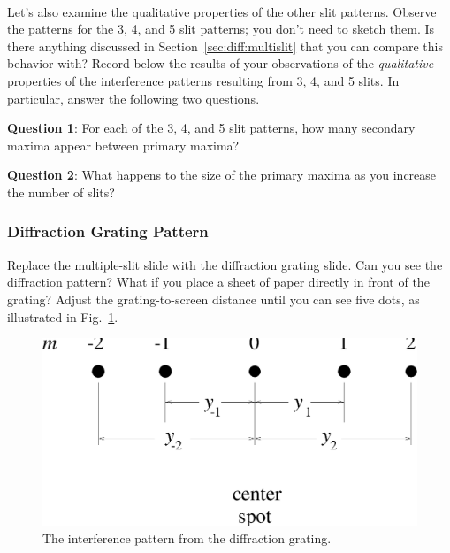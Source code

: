 \ \\
\noindent 
Let's also examine the qualitative properties of the other slit
patterns.  Observe the patterns for the 3, 4, and 5 slit patterns; you
don't need to sketch them.  Is there anything discussed in
Section~\ref{sec:diff:multislit} that you can compare this behavior
with?  Record below the results of your observations of the {\it
qualitative} properties of the interference patterns resulting from 3,
4, and 5 slits. In particular, answer the following two questions. 
\vspace*{.5cm}

\noindent 
{\bf Question 1}: For each of the 3, 4, and 5 slit patterns, how many
secondary maxima appear between primary maxima?
\vspace*{.8cm}

\noindent
{\bf Question 2}: What happens to the size of the primary maxima as you
increase the number of slits?\\








\subsubsection{Diffraction Grating Pattern} 

Replace the multiple-slit slide with the diffraction grating slide.  Can you
see the diffraction pattern?  What if you place a sheet of paper directly in
front of the grating? Adjust the grating-to-screen distance until you can see
five dots, as illustrated in Fig.~\ref{fig:diff:diffgratpat}. 
\begin{figure}[htb]
\centering 
\epsfxsize=8cm \includegraphics[scale=0.6]{10_diffraction/diffpatt.eps}
\caption{The interference pattern from the diffraction grating.} 
\label{fig:diff:diffgratpat}
\end{figure}


